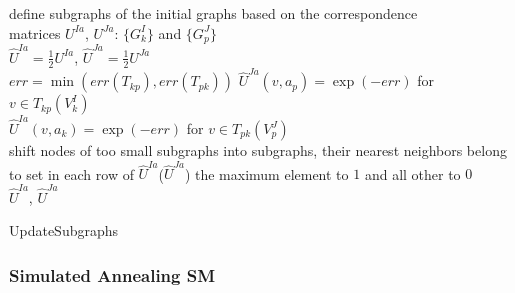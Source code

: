 \vspace{20pt}
\begin{algorithm}[H]
	\nl define subgraphs of the initial graphs based on the correspondence \\
	matrices $U^{Ia}$, $U^{Ja}$: $\{G^I_k\}$ and  $\{G^J_p\}$ \\
	\nl $\hat{U}^{Ia} = \frac{1}{2}U^{Ia}$, $\hat{U}^{Ja} = \frac{1}{2}U^{Ja}$ \\
	\nl {}
			{
				{ 
			      $err = \min(err(T_{kp}), err(T_{pk}))$ 
			         {
			          $\hat{U}^{Ja}(v, a_p) = \exp(-err)$ for $v\in T_{kp}(V^{I}_k)$ \\
   		 	          $\hat{U}^{Ia}(v, a_k) = \exp(-err)$ for $v\in T_{pk}(V^{J}_p)$ \\
   		 	         }
   		 	    }
    		 	{shift nodes of too small subgraphs into subgraphs, their nearest neighbors belong to} 
		    }			
	\nl  set in each row of  $\hat{U}^{Ia}$($\hat{U}^{Ja}$) the maximum element to $1$ and all other to $0$\\
	\Return $\hat{U}^{Ia}$, $\hat{U}^{Ja}$
	
	\caption{UpdateSubgraphs}    \label{alg:update_subgraphs}
\end{algorithm}

\FloatBarrier

\subsubsection{Simulated Annealing \textbf{SM}}

